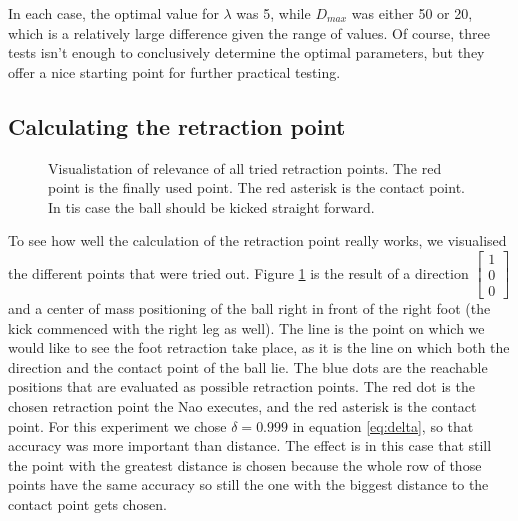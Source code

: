 \documentclass[a4paper]{article}
\begin{document}
In each case, the optimal value for $\lambda$ was 5, while $D_{max}$ was either
50 or 20, which is a relatively large difference given the range of values. Of
course, three tests isn't enough to conclusively determine the optimal
parameters, but they offer a nice starting point for further practical testing.


\subsection{Calculating the retraction point}
\begin{figure}[htbp]
  \centering
  \caption{Visualistation of relevance of all tried retraction points. The red
      point is the finally used point. The red asterisk is the contact point. In
      tis case the ball should be kicked straight forward.
         }
  \label{fig:retraction_plot1}
\end{figure}
\FloatBarrier
To see how well the calculation of the retraction point really works, we
visualised the different points that were tried out. Figure \ref{fig:retraction_plot1}
is the result of a direction 
$\begin{bmatrix} 1 \\  0 \\ 0 \end{bmatrix}$ and a center of mass positioning of
    the ball right in front of the right foot (the kick commenced with the right
    leg as well). The line is the point on which we
    would like to see the foot retraction take place, as it is the line on which
    both the direction and the contact point of the ball lie. The blue dots are
    the reachable positions that are evaluated as possible retraction points. The red dot is the
    chosen retraction point the Nao executes, and the red asterisk is the contact
    point. For this experiment we chose 
    $\delta = 0.999$ in equation \ref{eq:delta}, so that accuracy was more important than distance. The
    effect is in this case that still the point with the greatest distance is
    chosen because the whole row of those points have the same accuracy so still
    the one with the biggest distance to the contact point gets chosen.
\end{document}
